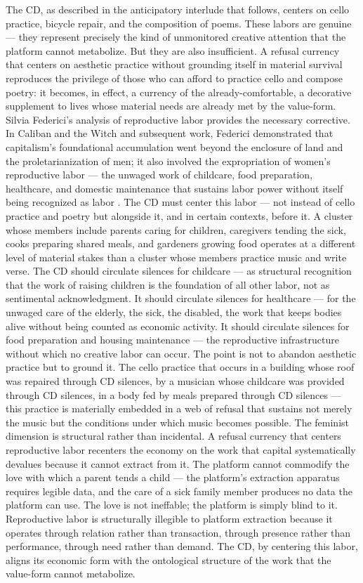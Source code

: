 The CD, as described in the anticipatory interlude that follows, centers on cello practice, bicycle repair, and the composition of poems. These labors are genuine — they represent precisely the kind of unmonitored creative attention that the platform cannot metabolize. But they are also insufficient. A refusal currency that centers on aesthetic practice without grounding itself in material survival reproduces the privilege of those who can afford to practice cello and compose poetry: it becomes, in effect, a currency of the already-comfortable, a decorative supplement to lives whose material needs are already met by the value-form. Silvia Federici’s analysis of reproductive labor provides the necessary corrective. In Caliban and the Witch and subsequent work, Federici demonstrated that capitalism’s foundational accumulation went beyond the enclosure of land and the proletarianization of men; it also involved the expropriation of women’s reproductive labor — the unwaged work of childcare, food preparation, healthcare, and domestic maintenance that sustains labor power without itself being recognized as labor \cite{federici_2004}. The CD must center this labor — not instead of cello practice and poetry but alongside it, and in certain contexts, before it. A cluster whose members include parents caring for children, caregivers tending the sick, cooks preparing shared meals, and gardeners growing food operates at a different level of material stakes than a cluster whose members practice music and write verse. The CD should circulate silences for childcare — as structural recognition that the work of raising children is the foundation of all other labor, not as sentimental acknowledgment. It should circulate silences for healthcare — for the unwaged care of the elderly, the sick, the disabled, the work that keeps bodies alive without being counted as economic activity. It should circulate silences for food preparation and housing maintenance — the reproductive infrastructure without which no creative labor can occur. The point is not to abandon aesthetic practice but to ground it. The cello practice that occurs in a building whose roof was repaired through CD silences, by a musician whose childcare was provided through CD silences, in a body fed by meals prepared through CD silences — this practice is materially embedded in a web of refusal that sustains not merely the music but the conditions under which music becomes possible. The feminist dimension is structural rather than incidental. A refusal currency that centers reproductive labor recenters the economy on the work that capital systematically devalues because it cannot extract from it. The platform cannot commodify the love with which a parent tends a child — the platform’s extraction apparatus requires legible data, and the care of a sick family member produces no data the platform can use. The love is not ineffable; the platform is simply blind to it. Reproductive labor is structurally illegible to platform extraction because it operates through relation rather than transaction, through presence rather than performance, through need rather than demand. The CD, by centering this labor, aligns its economic form with the ontological structure of the work that the value-form cannot metabolize.

